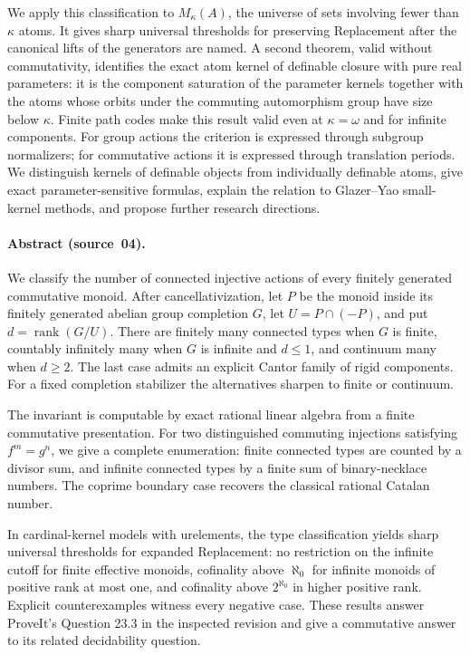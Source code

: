 \documentclass[11pt,letterpaper]{article}
\numberwithin{equation}{section}
\theoremstyle{plain}
\theoremstyle{definition}
\theoremstyle{remark}
\newcommand{\rank}{\operatorname{rank}}
\begin{document}
We apply this classification to $M_\kappa(A)$, the universe of sets involving
fewer than $\kappa$ atoms. It gives sharp universal thresholds for preserving
Replacement after the canonical lifts of the generators are named. A second
theorem, valid without commutativity, identifies the exact atom kernel of
definable closure with pure real parameters: it is the component saturation of
the parameter kernels together with the atoms whose orbits under the commuting
automorphism group have size below $\kappa$. Finite path codes make this result
valid even at $\kappa=\omega$ and for infinite components. For group actions the
criterion is expressed through subgroup normalizers; for commutative actions it
is expressed through translation periods. We distinguish kernels of definable
objects from individually definable atoms, give exact parameter-sensitive
formulas, explain the relation to Glazer--Yao small-kernel methods, and propose
further research directions.

\paragraph{Abstract (source~04).}
We classify the number of connected injective actions of every finitely
generated commutative monoid. After cancellativization, let $P$ be the
monoid inside its finitely generated abelian group completion $G$, let
$U=P\cap(-P)$, and put $d=\rank(G/U)$. There are finitely many connected
types when $G$ is finite, countably infinitely many when $G$ is infinite
and $d\leq1$, and continuum many when $d\geq2$. The last case admits an
explicit Cantor family of rigid components. For a fixed completion
stabilizer the alternatives sharpen to finite or continuum.

The invariant is computable by exact rational linear algebra from a
finite commutative presentation. For two distinguished commuting
injections satisfying $f^m=g^n$, we give a complete enumeration: finite
connected types are counted by a divisor sum, and infinite connected
types by a finite sum of binary-necklace numbers. The coprime boundary
case recovers the classical rational Catalan number.

In cardinal-kernel models with urelements, the type classification yields
sharp universal thresholds for expanded Replacement: no restriction on
the infinite cutoff for finite effective monoids, cofinality above
$\aleph_0$ for infinite monoids of positive rank at most one, and
cofinality above $2^{\aleph_0}$ in higher positive rank. Explicit
counterexamples witness every negative case. These results answer
ProveIt's Question 23.3 in the inspected revision and give a commutative
answer to its related decidability question.
\end{document}
